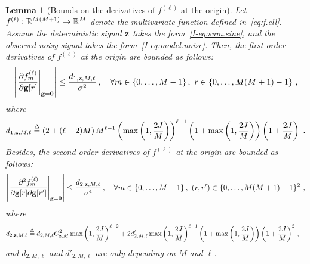 \documentclass[journal,onecolumn]{IEEEtran}
\newtheorem{lemma}{Lemma}
\begin{document}
\begin{lemma}[Bounds on the derivatives of $f^{(\ell)}$ at the origin]
Let $f^{(\ell)} : {\mathbb R}^{M(M+1)} \to {\mathbb R}^{M}$ denote the multivariate function defined in~\eqref{eq:f.ell}. Assume the deterministic signal ${\mathbf z}$ takes the form~\eqref{I-eq:sum.sine}, and the observed noisy signal takes the form~\eqref{I-eq:model.noise}. Then, the first-order derivatives of $f^{(\ell)}$ at the origin are bounded as follows:  
\begin{equation}
\left|\left.\dfrac{\partial f_m^{(\ell)}}{\partial \bg[r]}\right\vert_{\bg=\bzero}\right| \leq \dfrac{d_{1,\bz,M,\ell}}{\sigma^2}\,,\quad\forall m\in\{0,\ldots,M-1\}\,,\ r\in\{0,\ldots,M(M+1)-1\}\ ,
\label{eq:df.bound}
\end{equation}
where
\[
d_{1,\bz,M,\ell}\defeq \left(2 + (\ell-2)M\right)M^{\ell-1}\left(\max\left(1,\frac{2J}{M}\right)\right)^{\ell-1}\left(1+\max\left(1,\frac{2J}{M}\right)\right)\left(1+\frac{2J}{M}\right)\ .
\]
Besides, the second-order derivatives of $f^{(\ell)}$ at the origin are bounded as follows:  
\begin{equation}
\left|\left.\dfrac{\partial^2 f_m^{(\ell)}}{\partial \bg[r]\partial \bg[r']}\right\vert_{\bg=\bzero}\right| \leq \dfrac{d_{2,\bz,M,\ell}}{\sigma^4}\,,\quad\forall m\in\{0,\ldots,M-1\}\,,\ (r,r')\in\{0,\ldots,M(M+1)-1\}^2\ ,
\label{eq:d2f.bound}
\end{equation}
where 
\begin{align*}
d_{2,{\mathbf z},M,\ell} &\overset{\Delta}{=} d_{2,M,\ell}C_{{\mathbf z},M}^2\max\left(1,\frac{2J}{M}\right)^{\ell-2} + 2d'_{2,M,\ell}\max\left(1,\frac{2J}{M}\right)^{\ell-1}\left(1+\max\left(1,\frac{2J}{M}\right)\right)\left(1+\frac{2J}{M}\right)^2\,,
\end{align*}
and $d_{2,M,\ell}$ and $d'_{2,M,\ell}$ are only depending on $M$ and $\ell$.
\end{lemma}
\end{document}
